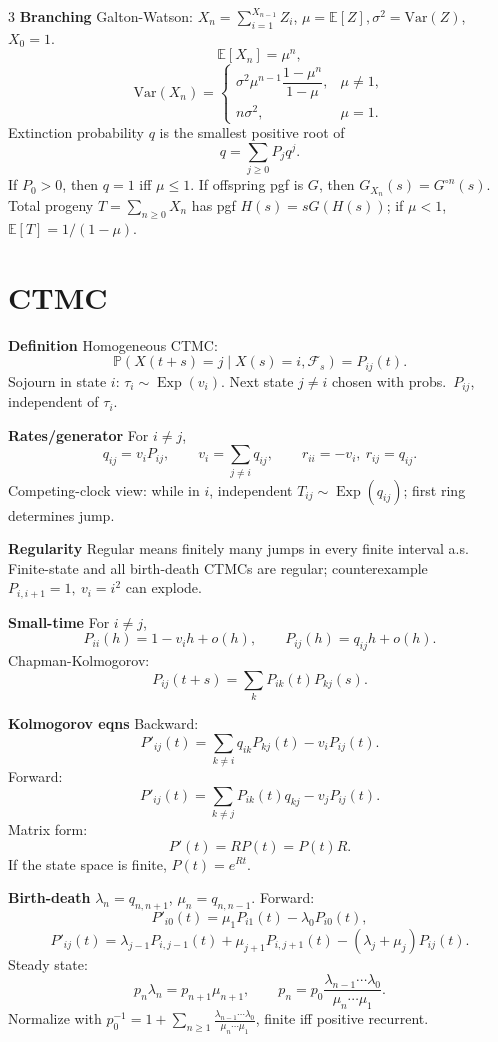 \documentclass[a4paper,8pt,fleqn]{extarticle}
\newcommand{\E}{\mathbb{E}}
\newcommand{\PP}{\mathbb{P}}
\newcommand{\Var}{\mathrm{Var}}
\newcommand{\1}{\mathbf{1}}
\newcommand{\sub}[1]{\textbf{#1} }
\DeclareMathOperator{\Exp}{Exp}
\begin{document}
\begin{multicols}{3}
\sub{Branching} Galton-Watson: \(X_n=\sum_{i=1}^{X_{n-1}}Z_i\), \(\mu=\E[Z], \sigma^2=\Var(Z)\), \(X_0=1\).
\[
\E[X_n]=\mu^n,
\]
\[
\Var(X_n)=
\begin{cases}
\sigma^2\mu^{n-1}\dfrac{1-\mu^n}{1-\mu},&\mu\ne1,\\[0.8ex]
n\sigma^2,&\mu=1.
\end{cases}
\]
Extinction probability \(q\) is the smallest positive root of
\[
q=\sum_{j\ge0} P_j q^j.
\]
If \(P_0>0\), then \(q=1\) iff \(\mu\le1\).
If offspring pgf is \(G\), then \(G_{X_n}(s)=G^{\circ n}(s)\). Total progeny \(T=\sum_{n\ge0}X_n\) has pgf \(H(s)=sG(H(s))\); if \(\mu<1\), \(\E[T]=1/(1-\mu)\).

\section*{CTMC}
\sub{Definition} Homogeneous CTMC:
\[
\PP(X(t+s)=j\mid X(s)=i,\mathcal F_s)=P_{ij}(t).
\]
Sojourn in state \(i\): \(\tau_i\sim \Exp(v_i)\). Next state \(j\ne i\) chosen with probs.\ \(P_{ij}\), independent of \(\tau_i\).

\sub{Rates/generator} For \(i\ne j\),
\[
q_{ij}=v_iP_{ij},\qquad v_i=\sum_{j\ne i}q_{ij},\qquad r_{ii}=-v_i,\ r_{ij}=q_{ij}.
\]
Competing-clock view: while in \(i\), independent \(T_{ij}\sim \Exp(q_{ij})\); first ring determines jump.

\sub{Regularity} Regular means finitely many jumps in every finite interval a.s. Finite-state and all birth-death CTMCs are regular; counterexample \(P_{i,i+1}=1,\ v_i=i^2\) can explode.

\sub{Small-time} For \(i\ne j\),
\[
P_{ii}(h)=1-v_i h+o(h),\qquad P_{ij}(h)=q_{ij}h+o(h).
\]
Chapman-Kolmogorov:
\[
P_{ij}(t+s)=\sum_k P_{ik}(t)P_{kj}(s).
\]

\sub{Kolmogorov eqns} Backward:
\[
P'_{ij}(t)=\sum_{k\ne i}q_{ik}P_{kj}(t)-v_iP_{ij}(t).
\]
Forward:
\[
P'_{ij}(t)=\sum_{k\ne j}P_{ik}(t)q_{kj}-v_jP_{ij}(t).
\]
Matrix form:
\[
P'(t)=RP(t)=P(t)R.
\]
If the state space is finite, \(P(t)=e^{Rt}\).

\sub{Birth-death} \(\lambda_n=q_{n,n+1}\), \(\mu_n=q_{n,n-1}\). Forward:
\[
P'_{i0}(t)=\mu_1P_{i1}(t)-\lambda_0P_{i0}(t),
\]
\[
P'_{ij}(t)=\lambda_{j-1}P_{i,j-1}(t)+\mu_{j+1}P_{i,j+1}(t)-(\lambda_j+\mu_j)P_{ij}(t).
\]
Steady state:
\[
p_n\lambda_n=p_{n+1}\mu_{n+1},\qquad
p_n=p_0\frac{\lambda_{n-1}\cdots \lambda_0}{\mu_n\cdots \mu_1}.
\]
Normalize with \(p_0^{-1}=1+\sum_{n\ge1}\frac{\lambda_{n-1}\cdots\lambda_0}{\mu_n\cdots\mu_1}\), finite iff positive recurrent.


\end{multicols}
\end{document}
